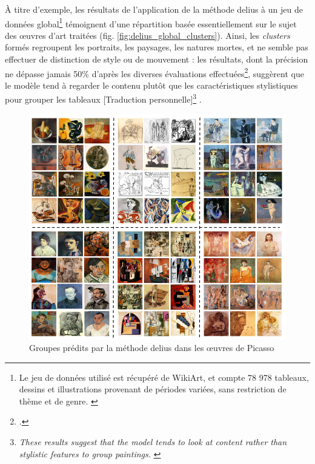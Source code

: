 	À titre d'exemple, les résultats de l'application de la méthode \acrshort{delius} à un jeu de données global\footnote{Le jeu de données utilisé est récupéré de WikiArt, et compte 78 978 tableaux, dessins et illustrations provenant de périodes variées, sans restriction de thème et de genre. \cite{ArtGANWikiArt}} témoignent d'une répartition basée essentiellement sur le sujet des œuvres d'art traitées (fig. \ref{fig:delius_global_clusters}). Ainsi, les \textit{clusters} formés regroupent les portraits, les paysages, les natures mortes, et ne semble pas effectuer de distinction de style ou de mouvement : les résultats, dont la précision ne dépasse jamais 50\% d'après les diverses évaluations effectuées\footcite{castellanoDeepLearningApproach2022}, \og suggèrent que le modèle tend à regarder le contenu plutôt que les caractéristiques stylistiques pour grouper les tableaux [Traduction personnelle]\footnote{\textit{\og These results suggest that the model tends to look at content rather than stylistic features to group paintings. \fg} \cite{castellanoDeepLearningApproach2022}} \fg.
	
	\begin{figure}[h]
		\centering
		\includegraphics[width=15cm]{images/delius_picasso_clusters.png}
		\caption{Groupes prédits par la méthode \acrshort{delius} dans les œuvres de Picasso}
		\label{fig:delius_picasso_clusters}
	\end{figure}

